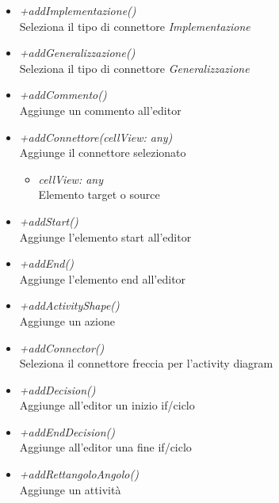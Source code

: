 \begin{itemize}
\begin{itemize}
    		\item \emph{+addImplementazione()}\\
    		Seleziona il tipo di connettore \textit{Implementazione}
    		\item \emph{+addGeneralizzazione()}\\
    		Seleziona il tipo di connettore \textit{Generalizzazione}
    		\item \emph{+addCommento()}\\
    		Aggiunge un commento all'editor
    		\item \emph{+addConnettore(cellView: any)}\\
    		Aggiunge il connettore selezionato
    		\begin{itemize}
    			\item \emph{cellView: any}\\
    			Elemento target o source
    		\end{itemize}
    		\item \emph{+addStart()}\\
    		Aggiunge l'elemento start all'editor
    		\item \emph{+addEnd()}\\
    		Aggiunge l'elemento end all'editor
    		\item \emph{+addActivityShape()}\\
    		Aggiunge un azione
    		\item \emph{+addConnector()}\\
    		Seleziona il connettore freccia per l'activity diagram
    		\item \emph{+addDecision()}\\
    		Aggiunge all'editor un inizio if/ciclo
    		\item \emph{+addEndDecision()}\\
    		Aggiunge all'editor una fine if/ciclo
    		\item \emph{+addRettangoloAngolo()}\\
    		Aggiunge un attività
		\end{itemize}
\end{itemize}